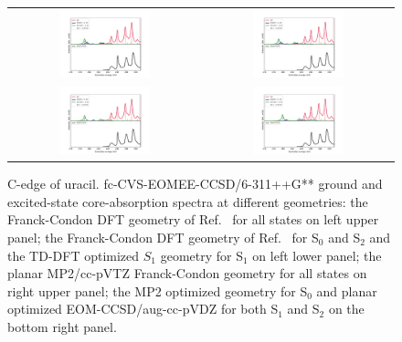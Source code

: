 \documentclass[journal=jctcce,manuscript=article]{achemso}
\begin{document}
\begin{figure}[H]
\caption{C-edge of uracil. fc-CVS-EOMEE-CCSD/6-311++G** ground and excited-state core-absorption spectra at different geometries: 
the Franck-Condon DFT geometry of Ref.~ for all states
on left upper panel; the Franck-Condon DFT geometry of Ref.~ for S$_0$ and S$_2$ and the TD-DFT 
optimized $S_1$ geometry for S$_1$ on left lower panel;  
the planar MP2/cc-pVTZ Franck-Condon geometry for all states
on right upper panel; the MP2 optimized geometry for S$_0$ and
planar optimized EOM-CCSD/aug-cc-pVDZ for both S$_1$ and S$_2$ 
on the bottom right panel.
\label{fgr:uracil:trnexafs_uracil_c}}
\begin{tabular}{cc}
\includegraphics[width=0.5\textwidth]{Spectra/Uracil_Sn_C_zoom.pdf} 
& 
\includegraphics[width=0.5\textwidth]{Spectra/FC_Uracil_Sn_C_zoom.pdf}
\\
\includegraphics[width=0.5\textwidth]{Spectra/S1opt_Uracil_Sn_C_zoom.pdf} 
&
\includegraphics[width=0.5\textwidth]{Spectra/Opt_Uracil_Sn_C_zoom.pdf}
\\
\end{tabular}
\end{figure}
\end{document}

